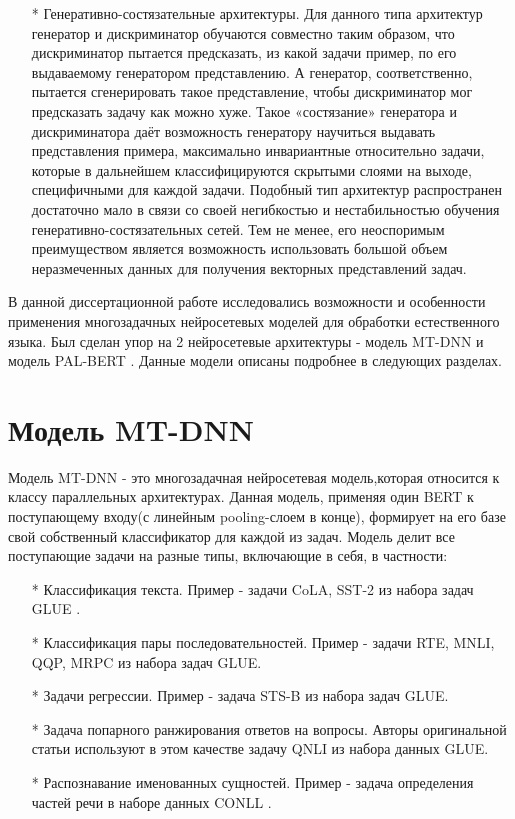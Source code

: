 \begin{itemize}
\item[*] Генеративно-состязательные архитектуры. Для данного типа архитектур генератор и дискриминатор обучаются совместно таким образом, что дискриминатор пытается предсказать, из какой задачи пример, по его выдаваемому генератором представлению. А генератор, соответственно, пытается сгенерировать такое представление, чтобы дискриминатор мог предсказать задачу как можно хуже. Такое «состязание» генератора и дискриминатора даёт возможность генератору научиться выдавать представления примера, максимально инвариантные относительно задачи, которые в дальнейшем классифицируются скрытыми слоями на выходе, специфичными для каждой задачи. Подобный тип архитектур распространен достаточно мало в связи со своей негибкостью и нестабильностью обучения генеративно-состязательных сетей. Тем не менее, его неоспоримым преимуществом является возможность использовать большой объем неразмеченных данных для получения векторных представлений задач. 
\end{itemize}

В данной диссертационной работе исследовались возможности и особенности применения многозадачных нейросетевых моделей для обработки естественного языка. Был сделан упор на 2 нейросетевые архитектуры - модель MT-DNN \cite{mtdnn} и модель PAL-BERT \cite{stickland_2019}. Данные модели описаны подробнее в следующих разделах.

\section{Модель MT-DNN}\label{ch:mtl:mtdnn}
Модель MT-DNN - это многозадачная нейросетевая модель,которая относится к классу параллельных архитектурах. Данная модель, применяя один BERT к поступающему входу(с линейным pooling-слоем в конце), формирует на его базе свой собственный классификатор для каждой из задач. Модель делит все поступающие задачи на разные типы, включающие в себя, в частности:
\begin{itemize}
\item[*] Классификация текста. Пример - задачи CoLA, SST-2 из набора задач GLUE \cite{wang_2018}.
\item[*] Классификация пары последовательностей. Пример - задачи RTE, MNLI, QQP, MRPC из набора задач GLUE. 
\item[*] Задачи регрессии. Пример - задача STS-B из набора задач GLUE. 
\item[*] Задача попарного ранжирования ответов на вопросы. Авторы оригинальной статьи используют в этом качестве задачу QNLI из набора данных GLUE.
\item[*] Распознавание именованных сущностей. Пример - задача определения частей речи в наборе данных CONLL \cite{sang_2003}. 
\end{itemize}

